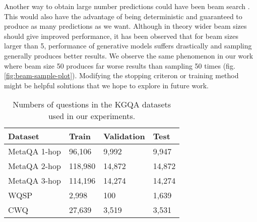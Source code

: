 \documentclass[11pt]{article}
\renewcommand\:{\colon} \newcommand{\sset}[1]{\left\{\,#1\,\right\}} \newcommand{\ssets}[1]{\left\{#1\right\}} \newcommand{\ssetn}[1]{\{\,#1\,\}}
\begin{document}
Another way to obtain large number predictions could have been beam search \cite{graves_beam_search}. This would also have the advantage of being deterministic and guaranteed to produce as many predictions as we want. Although in theory wider beam sizes should give improved performance, it has been observed that for beam sizes larger than 5, performance of generative models suffers drastically \cite{yang_beam_search_curse} and sampling generally produces better results. We observe the same phenomenon in our work where beam size 50 produces far worse results than sampling 50 times (fig. \ref{fig:beam-sample-plot}). Modifying the stopping criteron \cite{murray_length_bias} or training method \cite{unlikelihood_training} might be helpful solutions that we hope to explore in future work.
\begin{table}[t!]
\centering
\begin{tabular}{@{}llll@{}}
\toprule
\textbf{Dataset} & \textbf{Train} & \textbf{Validation} & \textbf{Test} \\ \midrule
MetaQA 1-hop     & 96,106         & 9,992               & 9,947         \\
MetaQA 2-hop     & 118,980        & 14,872              & 14,872        \\
MetaQA 3-hop     & 114,196        & 14,274              & 14,274        \\
WQSP             & 2,998          & 100                 & 1,639         \\
CWQ              & 27,639         & 3,519               & 3,531         \\ \bottomrule
\end{tabular}
\caption{Numbers of questions in the KGQA datasets used in our experiments.}
\label{tab:kgqa-dataset-stats}
\end{table} \begin{table}[t!]
\centering
{}
\end{table}
\end{document}
